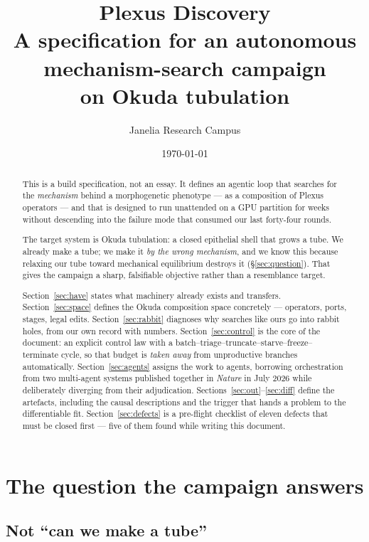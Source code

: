 \documentclass[11pt]{article}
\title{\textbf{Plexus Discovery}\\[4pt]
\large A specification for an autonomous mechanism-search campaign\\
\large on Okuda tubulation}
\author{Janelia Research Campus}
\date{\today}
\begin{document}
\maketitle

\begin{abstract}
\noindent
This is a build specification, not an essay. It defines an agentic loop that searches for the
\emph{mechanism} behind a morphogenetic phenotype --- as a composition of Plexus operators --- and
that is designed to run unattended on a GPU partition for weeks without descending into the
failure mode that consumed our last forty-four rounds.

The target system is Okuda tubulation: a closed epithelial shell that grows a tube. We already
make a tube; we make it \emph{by the wrong mechanism}, and we know this because relaxing our
tube toward mechanical equilibrium destroys it (\S\ref{sec:question}). That gives the campaign a
sharp, falsifiable objective rather than a resemblance target.

Section~\ref{sec:have} states what machinery already exists and transfers. Section~\ref{sec:space}
defines the Okuda composition space concretely --- operators, ports, stages, legal edits.
Section~\ref{sec:rabbit} diagnoses why searches like ours go into rabbit holes, from our own
record with numbers. Section~\ref{sec:control} is the core of the document: an explicit control
law with a batch--triage--truncate--starve--freeze--terminate cycle, so that budget is
\emph{taken away} from unproductive branches automatically. Section~\ref{sec:agents} assigns the
work to agents, borrowing orchestration from two multi-agent systems published together in
\emph{Nature} in July 2026 while deliberately diverging from their adjudication.
Sections~\ref{sec:out}--\ref{sec:diff} define the artefacts, including the causal descriptions
and the trigger that hands a problem to the differentiable fit. Section~\ref{sec:defects} is a
pre-flight checklist of eleven defects that must be closed first --- five of them found while
writing this document.
\end{abstract}

\tableofcontents

\section{The question the campaign answers}
\label{sec:question}

\subsection{Not ``can we make a tube''}
\end{document}
